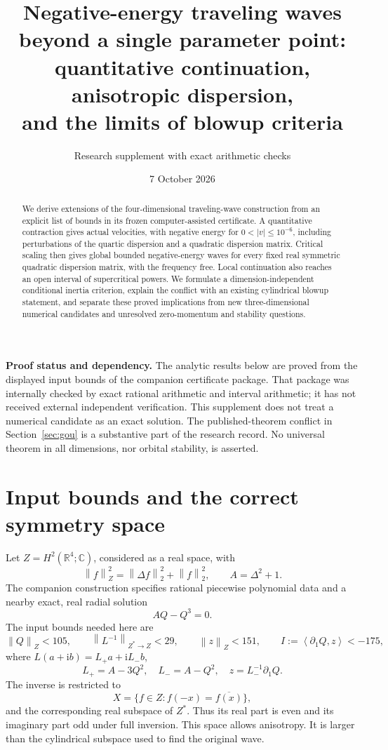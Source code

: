 \documentclass[11pt,a4paper]{article}
\title{Negative-energy traveling waves beyond a single parameter point:\\quantitative continuation, anisotropic dispersion,\\and the limits of blowup criteria}
\author{Research supplement with exact arithmetic checks}
\date{7 October 2026}
\theoremstyle{remark}\newtheorem{remark}[theorem]{Remark}
\newcommand{\R}{\mathbb R}\newcommand{\C}{\mathbb C}
\newcommand{\ii}{\mathrm i}\newcommand{\dd}{\,\mathrm d}
\newcommand{\norm}[1]{\left\|#1\right\|}
\newcommand{\ip}[2]{\left\langle #1,#2\right\rangle}
\begin{document}
\maketitle
\begin{abstract}
We derive extensions of the four-dimensional traveling-wave construction from an explicit list of bounds in its frozen computer-assisted certificate. A quantitative contraction gives actual velocities, with negative energy for $0<|v|\le10^{-6}$, including perturbations of the quartic dispersion and a quadratic dispersion matrix. Critical scaling then gives global bounded negative-energy waves for every fixed real symmetric quadratic dispersion matrix, with the frequency free. Local continuation also reaches an open interval of supercritical powers. We formulate a dimension-independent conditional inertia criterion, explain the conflict with an existing cylindrical blowup statement, and separate these proved implications from new three-dimensional numerical candidates and unresolved zero-momentum and stability questions.
\end{abstract}

\noindent\textbf{Proof status and dependency.} The analytic results below are proved from the displayed input bounds of the companion certificate package. That package was internally checked by exact rational arithmetic and interval arithmetic; it has not received external independent verification. This supplement does not treat a numerical candidate as an exact solution. The published-theorem conflict in Section~\ref{sec:gou} is a substantive part of the research record. No universal theorem in all dimensions, nor orbital stability, is asserted.

\section{Input bounds and the correct symmetry space}
Let $Z=H^2(\R^4;\C)$, considered as a real space, with
\[
 \norm f_Z^2=\norm{\Delta f}_2^2+\norm f_2^2,
 \qquad A=\Delta^2+1.
\]
The companion construction specifies rational piecewise polynomial data and a nearby exact, real radial solution
\[
 AQ-Q^3=0.
\]
The input bounds needed here are
\begin{equation}\label{eq:inputs}
 \norm Q_Z<105,\qquad
 \norm{L^{-1}}_{Z^*\to Z}<29,\qquad
 \norm z_Z<151,\qquad I:=\ip{\partial_1Q}{z}<-175,
\end{equation}
where $L(a+\ii b)=L_+a+\ii L_-b$,
\[
 L_+=A-3Q^2,\quad L_-=A-Q^2,\quad z=L_-^{-1}\partial_1Q.
\]
The inverse is restricted to
\begin{equation}\label{eq:PT}
 X=\{f\in Z:f(-x)=\overline{f(x)}\},
\end{equation}
and the corresponding real subspace of $Z^*$. Thus its real part is even and its imaginary part odd under full inversion. This space allows anisotropy. It is larger than the cylindrical subspace used to find the original wave.
\end{document}
